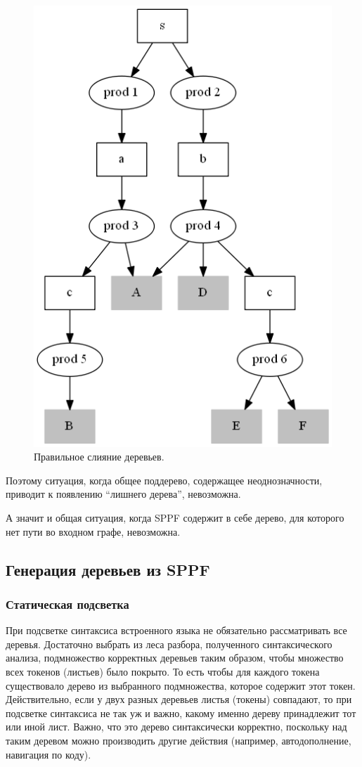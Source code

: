 \begin{figure}[t]
\centering
\includegraphics[width=0.5\linewidth]{Ivanov/Pictures/proof_correct_merge.png}
\caption{Правильное слияние деревьев.}
\label{sppf_proof_correct}
\end{figure}

Поэтому ситуация, когда общее поддерево, содержащее неоднозначности, приводит к появлению ``лишнего дерева'', невозможна. 

А значит и общая ситуация, когда SPPF содержит в себе дерево, для которого нет пути во входном графе, невозможна.

\subsection{Генерация деревьев из SPPF}
\subsubsection{Статическая подсветка}
При подсветке синтаксиса встроенного языка не обязательно рассматривать все деревья. Достаточно выбрать из леса разбора, полученного синтаксического анализа, подмножество корректных деревьев таким образом, чтобы множество всех токенов (листьев) было покрыто. То есть чтобы для каждого токена существовало дерево из выбранного подмножества, которое содержит этот токен. Действительно, если у двух разных деревьев листья (токены) совпадают, то при подсветке синтаксиса не так уж и важно, какому именно дереву принадлежит тот или иной лист. Важно, что это дерево синтаксически корректно, поскольку над таким деревом можно производить другие действия (например, автодополнение, навигация по коду).

